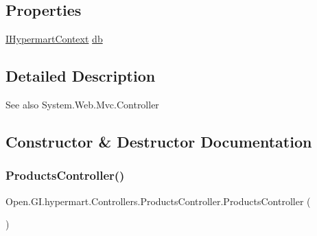 \subsection*{Properties}
\begin{DoxyCompactItemize}
\item 
\hyperlink{interface_open_1_1_g_i_1_1hypermart_1_1_d_a_l_1_1_i_hypermart_context}{I\+Hypermart\+Context} \hyperlink{class_open_1_1_g_i_1_1hypermart_1_1_controllers_1_1_products_controller_aec73a09108adc7af8384701886c5e53a}{db}
\end{DoxyCompactItemize}


\subsection{Detailed Description}


\begin{DoxySeeAlso}{See also}
System.\+Web.\+Mvc.\+Controller


\end{DoxySeeAlso}


\subsection{Constructor \& Destructor Documentation}
\hypertarget{class_open_1_1_g_i_1_1hypermart_1_1_controllers_1_1_products_controller_aa13f8209001ea23ae8bc01e98eed6326}{}\label{class_open_1_1_g_i_1_1hypermart_1_1_controllers_1_1_products_controller_aa13f8209001ea23ae8bc01e98eed6326} 
\subsubsection{\texorpdfstring{Products\+Controller()}{ProductsController()}\hspace{0.1cm}{\footnotesize\ttfamily [1/2]}}
{\footnotesize\ttfamily Open.\+G\+I.\+hypermart.\+Controllers.\+Products\+Controller.\+Products\+Controller (\begin{DoxyParamCaption}{ }\end{DoxyParamCaption})}



